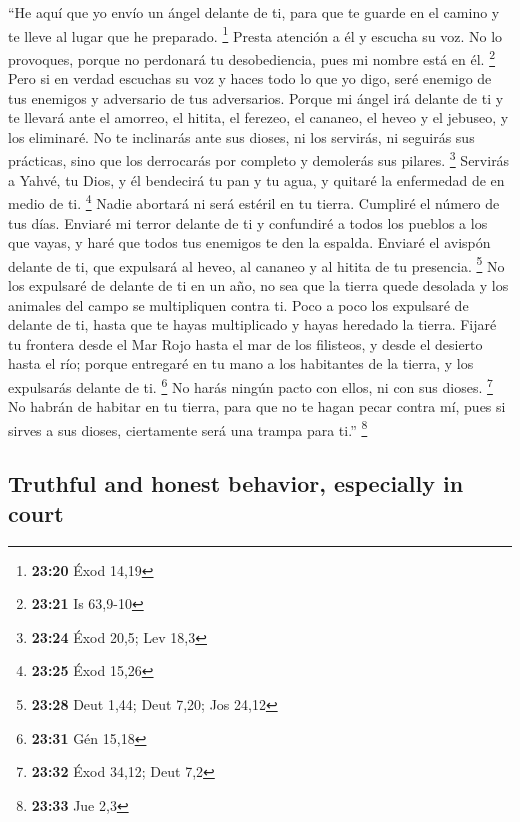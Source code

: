 \begin{paracol}{2}
 ``He aquí que yo envío un ángel delante de ti, para que
te guarde en el camino y te lleve al lugar que he preparado. \footnote{\textbf{23:20}
  Éxod 14,19}  Presta atención a él y escucha su voz. No
lo provoques, porque no perdonará tu desobediencia, pues mi nombre está
en él. \footnote{\textbf{23:21} Is 63,9-10}  Pero si en
verdad escuchas su voz y haces todo lo que yo digo, seré enemigo de tus
enemigos y adversario de tus adversarios.  Porque mi
ángel irá delante de ti y te llevará ante el amorreo, el hitita, el
ferezeo, el cananeo, el heveo y el jebuseo, y los eliminaré.
 No te inclinarás ante sus dioses, ni los servirás, ni
seguirás sus prácticas, sino que los derrocarás por completo y demolerás
sus pilares. \footnote{\textbf{23:24} Éxod 20,5; Lev 18,3}
 Servirás a Yahvé, tu Dios, y él bendecirá tu pan y tu
agua, y quitaré la enfermedad de en medio de ti. \footnote{\textbf{23:25}
  Éxod 15,26}  Nadie abortará ni será estéril en tu
tierra. Cumpliré el número de tus días.  Enviaré mi
terror delante de ti y confundiré a todos los pueblos a los que vayas, y
haré que todos tus enemigos te den la espalda.  Enviaré
el avispón delante de ti, que expulsará al heveo, al cananeo y al hitita
de tu presencia. \footnote{\textbf{23:28} Deut 1,44; Deut 7,20; Jos
  24,12}  No los expulsaré de delante de ti en un año, no
sea que la tierra quede desolada y los animales del campo se
multipliquen contra ti.  Poco a poco los expulsaré de
delante de ti, hasta que te hayas multiplicado y hayas heredado la
tierra.  Fijaré tu frontera desde el Mar Rojo hasta el
mar de los filisteos, y desde el desierto hasta el río; porque entregaré
en tu mano a los habitantes de la tierra, y los expulsarás delante de
ti. \footnote{\textbf{23:31} Gén 15,18}  No harás ningún
pacto con ellos, ni con sus dioses. \footnote{\textbf{23:32} Éxod 34,12;
  Deut 7,2}  No habrán de habitar en tu tierra, para que
no te hagan pecar contra mí, pues si sirves a sus dioses, ciertamente
será una trampa para ti.'' \footnote{\textbf{23:33} Jue 2,3}

\switchcolumn
\begin{otherlanguage}{english}

\hypertarget{truthful-and-honest-behavior-especially-in-court}{%
\subsection{Truthful and honest behavior, especially in
court}\label{truthful-and-honest-behavior-especially-in-court}}


\end{otherlanguage}
\end{paracol}
